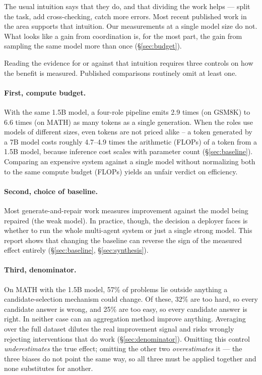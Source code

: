 \documentclass[11pt,a4paper]{article}
\begin{document}
The usual intuition says that they do, and that dividing the work helps --- split the task, add cross-checking, catch more errors. Most recent published work in the area supports that intuition. Our measurements at a single model size do not. What looks like a gain from coordination is, for the most part, the gain from sampling the same model more than once (\S\ref{sec:budget}).

Reading the evidence for or against that intuition requires three controls on how the benefit is measured. Published comparisons routinely omit at least one.

\paragraph{First, compute budget.} With the same 1.5B model, a four-role pipeline emits 2.9 times (on GSM8K) to
6.6 times (on MATH) as many tokens as a single generation. When the roles use models of different sizes, even
tokens are not priced alike -- a token generated by a 7B model costs roughly 4.7--4.9 times the arithmetic (FLOPs)
of a token from a 1.5B model, because inference cost scales with parameter count \cite{kaplan2020}
(\S\ref{sec:baseline}). Comparing an expensive system against a single model without normalizing both to the same compute budget (FLOPs) yields an unfair verdict on efficiency.

\paragraph{Second, choice of baseline.} Most generate-and-repair work measures improvement against the model being repaired (the weak model). In practice, though, the decision a deployer faces is whether to run the whole multi-agent system or just a single strong model. This report shows that changing the baseline can reverse the sign of the measured effect entirely (\S\ref{sec:baseline},
\S\ref{sec:synthesis}).

\paragraph{Third, denominator.} On MATH with the 1.5B model, 57\% of problems lie outside anything a candidate-selection mechanism could change. Of these, 32\% are too hard, so every candidate answer is wrong, and 25\% are too easy, so every candidate answer is right. In neither case can an aggregation method improve anything. Averaging over the full dataset dilutes the real improvement signal and risks wrongly rejecting interventions that do work (\S\ref{sec:denominator}). Omitting this control \emph{underestimates} the true effect; omitting the other two \emph{overestimates} it --- the three biases do not point the same way, so all three must be applied together and none substitutes for another.
\end{document}
